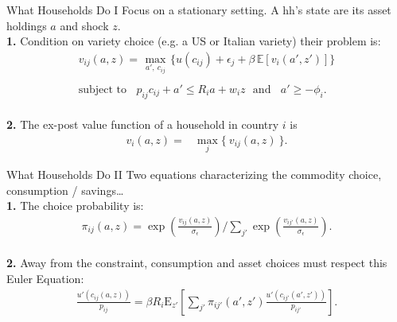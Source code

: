 \documentclass[9pt,pdftex,aspectratio=1610]{beamer}
\theoremstyle{definition}
\begin{document}

\begin{frame}[t]{What Households Do I}
\smallskip
Focus on a stationary setting. A hh's state are its asset holdings $a$ and shock $z$.\\
\bigskip
\textbf{1.} Condition on variety choice (e.g. a US or Italian variety) their problem is:
\begin{align}
v_{ij}(a, z) =   \max_{\ a', \ c_{ij}  \ }\bigg  \{ u(c_{ij}) + \epsilon_{j}  + \beta \, \mathbb{E} [v_{i}(a', z')]  \bigg\} \nonumber \\
\nonumber \\
\mbox{subject to}  \ \ \  \  p_{ij}c_{ij} +  a' \leq    R_{i} a + w_{i} z \ \ \  \mbox{and} \ \ \ \ a' \geq - \phi_{i}. \nonumber
\end{align}\\
\bigskip
\medskip
\textbf{2.} The ex-post value function of a household in country $i$ is
\begin{align}
v_{i}(a, z) = &  \max_{j} \big  \{ \  v_{ij}(a, z)  \ \big \}. \nonumber
\end{align}
\end{frame}


\begin{frame}[t]{What Households Do II}
\smallskip
Two equations characterizing the commodity choice, consumption / savings\ldots\\
\bigskip
\textbf{1.} The choice probability is:
\begin{align*}
\pi_{ij}(a, z) = \exp \left( \frac{ v_{ij}(a, z) }{\sigma_{\epsilon}} \right) \Bigg / \sum_{j'} \exp \left( \frac{ v_{ij'}(a, z) }{\sigma_{\epsilon}} \right).
\end{align*}
\\
\bigskip
\bigskip
\textbf{2.} Away from the constraint, consumption and asset choices must respect this Euler Equation:
\begin{align*}
\frac{u'(c_{ij}(a, z))}{p_{ij}} = \beta R_{i} \mathrm{E}_{z'} \left[ \sum_{j'} \pi_{ij'}(a', z') \frac{u'(c_{ij'}(a', z'))}{p_{ij'}} \right].
\end{align*}
\end{frame}
\end{document}
